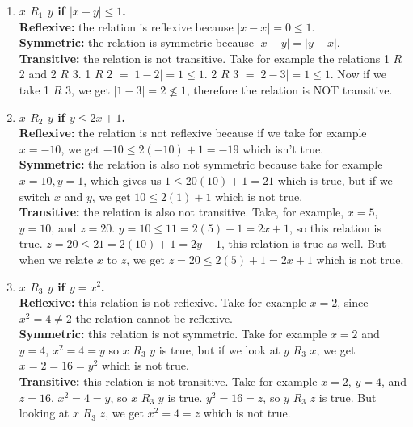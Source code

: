 \documentclass[10pt]{article}
\begin{document}
\begin{enumerate}[label=(\alph*)]

    \item \textbf{$x$ $R_1$ $y$ if $|x - y| \leq 1$.} \\
        \textbf{Reflexive:} the relation is reflexive because $|x - x| = 0 \leq 1$. \\
        \textbf{Symmetric:} the relation is symmetric because $|x - y| = |y - x|$. \\
        \textbf{Transitive:} the relation is not transitive.  Take for example the relations 1 $R$ 2 and 2 $R$ 3. 1 $R$ 2 $= |1 - 2| = 1 \leq 1$.
        2 $R$ 3 $= |2 - 3| = 1 \leq 1$.  Now if we take 1 $R$ 3, we get $|1 - 3| = 2 \not\leq 1$, therefore the relation is NOT transitive.

    \item \textbf{$x$ $R_2$ $y$ if $y \leq 2x + 1$.} \\
        \textbf{Reflexive:} the relation is not reflexive because if we take for example $x = -10$, we get $-10 \leq 2(-10) + 1 = -19$ which isn't true. \\
        \textbf{Symmetric:} the relation is also not symmetric because take for example $x = 10, y = 1$, which gives us $1 \leq 20(10) + 1 = 21$ which
        is true, but if we switch $x$ and $y$, we get $10 \leq 2(1) + 1$ which is not true. \\
        \textbf{Transitive:} the relation is also not transitive.  Take, for example, $x = 5$, $y = 10$, and $z = 20$.  $y = 10 \leq 11 = 2(5) + 1 = 2x + 1$,
        so this relation is true.  $z = 20 \leq 21 = 2(10) + 1 = 2y + 1$, this relation is true as well.  But when we relate $x$ to $z$, we get
        $z = 20 \leq 2(5) + 1 = 2x + 1$ which is not true.

    \item \textbf{$x$ $R_3$ $y$ if $y = x^2$.} \\
        \textbf{Reflexive:} this relation is not reflexive.  Take for example $x = 2$, since $x^2 = 4 \not= 2$ the relation cannot be reflexive. \\
        \textbf{Symmetric:} this relation is not symmetric.  Take for example $x = 2$ and $y = 4$, $x^2 = 4 = y$ so $x$ $R_3$ $y$ is true, but if we look at
        $y$ $R_3$ $x$, we get $x = 2 = 16 = y^2$ which is not true. \\
        \textbf{Transitive:} this relation is not transitive.  Take for example $x = 2$, $y = 4$, and $z = 16$.  $x^2 = 4 = y$, so $x$ $R_3$ $y$ is true.
        $y^2 = 16 = z$, so $y$ $R_3$ $z$ is true.  But looking at $x$ $R_3$ $z$, we get $x^2 = 4 = z$ which is not true.


\end{enumerate}
\end{document}
